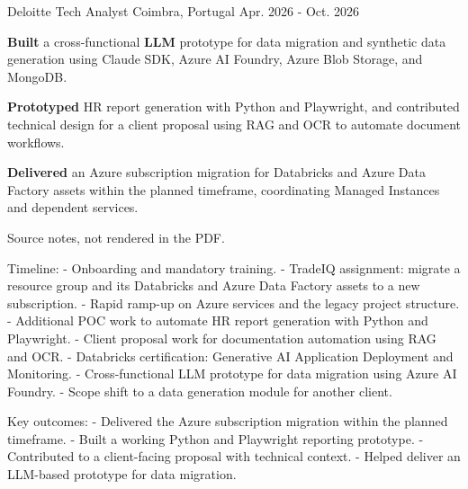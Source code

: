 

\begin{cventries}

\cventry
  {Deloitte} %
  {Tech Analyst} %
  {Coimbra, Portugal} %
  {Apr. 2026 - Oct. 2026} %
  {
    \begin{cvitems} %
      \item {\textbf{Built} a cross-functional \textbf{LLM} prototype for data migration and synthetic data generation using Claude SDK, Azure AI Foundry, Azure Blob Storage, and MongoDB.}
      \item {\textbf{Prototyped} HR report generation with Python and Playwright, and contributed technical design for a client proposal using RAG and OCR to automate document workflows.}
      \item {\textbf{Delivered} an Azure subscription migration for Databricks and Azure Data Factory assets within the planned timeframe, coordinating Managed Instances and dependent services.}
    \end{cvitems}
  }
  {
    Source notes, not rendered in the PDF.

    Timeline:
    - Onboarding and mandatory training.
    - TradeIQ assignment: migrate a resource group and its Databricks and Azure Data Factory assets to a new subscription.
    - Rapid ramp-up on Azure services and the legacy project structure.
    - Additional POC work to automate HR report generation with Python and Playwright.
    - Client proposal work for documentation automation using RAG and OCR.
    - Databricks certification: Generative AI Application Deployment and Monitoring.
    - Cross-functional LLM prototype for data migration using Azure AI Foundry.
    - Scope shift to a data generation module for another client.

    Key outcomes:
    - Delivered the Azure subscription migration within the planned timeframe.
    - Built a working Python and Playwright reporting prototype.
    - Contributed to a client-facing proposal with technical context.
    - Helped deliver an LLM-based prototype for data migration.

}
\end{cventries}
